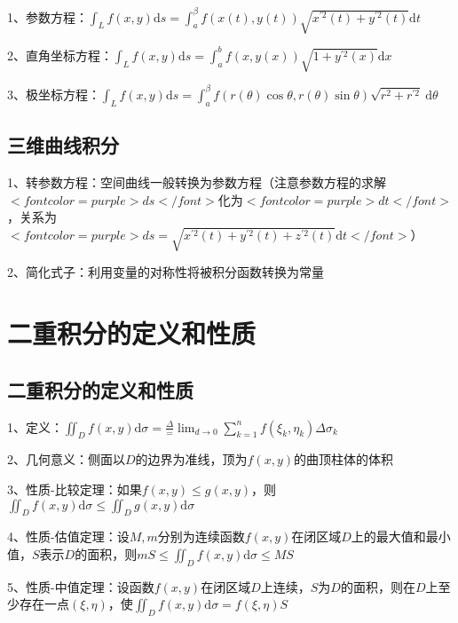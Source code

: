 1、参数方程：$ \int_{L} f(x, y) \mathrm{d} s=\int_{a}^{\beta} f(x(t), y(t)) \sqrt{x^{\prime 2}(t)+y^{\prime 2}(t)} \mathrm{d} t $

2、直角坐标方程：$ \int_{L} f(x, y) \mathrm{d} s=\int_{a}^{b} f(x, y(x)) \sqrt{1+y^{\prime 2}(x)} \mathrm{d} x $

3、极坐标方程：$ \int_{L} f(x, y) \mathrm{d} s=\int_{a}^{\beta} f(r(\theta) \cos \theta, r(\theta) \sin \theta) \sqrt{r^{2}+r^{\prime 2}} \mathrm{~d} \theta $



\subsection{三维曲线积分}

1、转参数方程：空间曲线一般转换为参数方程（注意参数方程的求解$ <font color=purple>ds</font> $化为$ <font color=purple>dt</font> $，关系为$ <font color=purple>ds = \sqrt{x^{\prime 2}(t)+y^{\prime 2}(t)+z^{\prime 2}(t)} \mathrm{d} t</font> $）

2、简化式子：利用变量的对称性将被积分函数转换为常量

\section{二重积分的定义和性质}



\subsection{二重积分的定义和性质}

1、定义：$ \iint_{D} f(x, y) \mathrm{d} \sigma=\frac{\Delta}{=} \lim _{d \rightarrow 0} \sum_{k=1}^{n} f\left(\xi_{k}, \eta_{k}\right) \Delta \sigma_{k} $

2、几何意义：侧面以$ D $的边界为准线，顶为$ f(x, y) $的曲顶柱体的体积

3、性质-比较定理：如果$ f(x, y) \leqslant g(x, y) $，则$ \iint_{D} f(x, y) \mathrm{d} \sigma \leqslant \iint_{D} g(x, y) \mathrm{d} \sigma $

4、性质-估值定理：设$ M, m $分别为连续函数$ f(x, y) $在闭区域$ D $上的最大值和最小值，$ S $表示$ D $的面积，则$ m S \leqslant \iint_{D} f(x, y) \mathrm{d} \sigma \leqslant M S $

5、性质-中值定理：设函数$ f(x, y) $在闭区域$ D $上连续，$ S $为$ D $的面积，则在$ D $上至少存在一点$ (\xi, \eta) $，使$ \iint_{D} f(x, y) \mathrm{d} \sigma=f(\xi, \eta) S $



